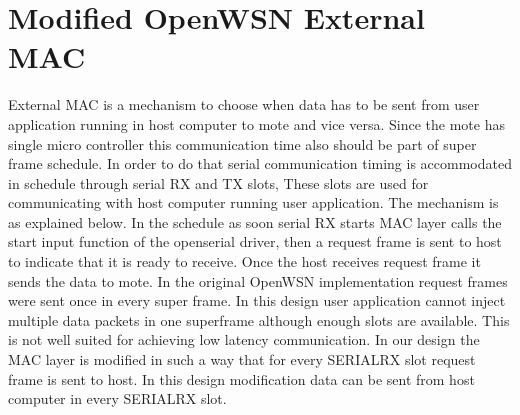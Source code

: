 \section{Modified OpenWSN External MAC}
External MAC is a mechanism to choose when data has to be sent from user application running in host computer to mote and vice versa. Since the mote has single micro controller this communication time also should be part of super frame schedule. In order to do that serial communication timing is accommodated in schedule through serial RX and TX slots, These slots are used  for communicating with host computer running user application. The mechanism is as explained below. In the schedule as soon serial RX starts MAC layer calls the start input function of the openserial driver, then a request frame is sent to host to indicate that it is ready to receive. Once the host receives request frame it sends the data to mote. In the original OpenWSN implementation request frames were sent once in every super frame. In this design user application cannot inject multiple data packets in one superframe although enough slots are available.  This is not well suited for achieving low latency communication. In our design the MAC layer is modified in such a way that for every SERIALRX slot request frame is sent to host. In this design modification data can be sent from host computer in every SERIALRX slot.

%
%

